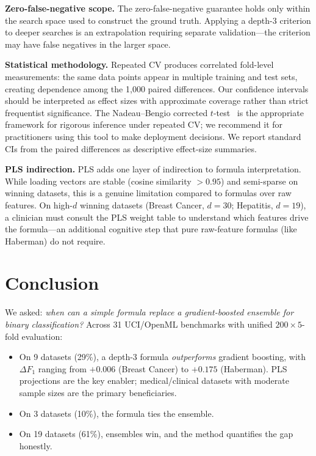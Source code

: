 \documentclass[journal]{IEEEtran}
\begin{document}
\textbf{Zero-false-negative scope.}
The zero-false-negative guarantee holds only within the search
space used to construct the ground truth.  Applying a depth-3
criterion to deeper searches is an extrapolation requiring separate
validation---the criterion may have false negatives in the larger
space.

\textbf{Statistical methodology.}
Repeated CV produces correlated fold-level measurements: the same
data points appear in multiple training and test sets, creating
dependence among the 1{,}000 paired differences.  Our confidence
intervals should be interpreted as effect sizes with approximate
coverage rather than strict frequentist significance.  The
Nadeau--Bengio corrected $t$-test~\cite{nadeau2003inference} is the
appropriate framework for rigorous inference under repeated CV; we
recommend it for practitioners using this tool to make deployment
decisions.  We report standard CIs from the paired differences
as descriptive effect-size summaries.

\textbf{PLS indirection.}
PLS adds one layer of indirection to formula interpretation.  While
loading vectors are stable (cosine similarity $> 0.95$) and
semi-sparse on winning datasets, this is a genuine limitation
compared to formulas over raw features.  On high-$d$ winning
datasets (Breast Cancer, $d = 30$; Hepatitis, $d = 19$), a
clinician must consult the PLS weight table to understand which
features drive the formula---an additional cognitive step that
pure raw-feature formulas (like Haberman) do not require.

\section{Conclusion}

We asked: \emph{when can a simple formula replace a gradient-boosted
ensemble for binary classification?}  Across 31 UCI/OpenML
benchmarks with unified $200 \times 5$-fold evaluation:

\begin{itemize}
\item On 9 datasets (29\%), a depth-3 formula \emph{outperforms}
gradient boosting, with $\Delta F_1$ ranging from $+0.006$
(Breast Cancer) to $+0.175$ (Haberman).  PLS projections are the
key enabler; medical/clinical datasets with moderate sample sizes
are the primary beneficiaries.
\item On 3 datasets (10\%), the formula ties the ensemble.
\item On 19 datasets (61\%), ensembles win, and the method
quantifies the gap honestly.
\end{itemize}
\end{document}
